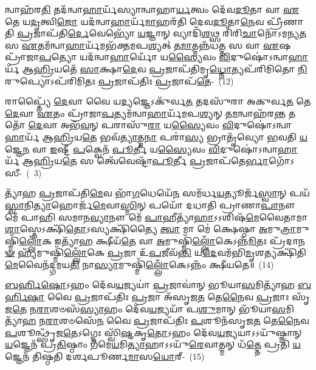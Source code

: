 𑌨𑍍𑌵𑌾𑌹᳴𑌰\-\ul{𑌤𑌿} 𑌤𑌦᳴𑌨𑍍𑌵𑌾\-\ul{𑌹𑌾}\-𑌰𑍍𑌯᳴𑌸𑍍𑌯𑌾𑌨𑍍𑌵𑌾𑌹𑌾\-\ul{𑌰𑍍𑌯}\-𑌤𑍍𑌵𑌂 𑌦𑍇᳴𑌵\-\ul{𑌦𑍂}\-𑌤𑌾 𑌵𑌾 \ul{𑌏}\-𑌤𑍇 𑌯\-\ul{𑌦𑍃}\-𑌤𑍍𑌵𑌿\-\ul{𑌜𑍋} 𑌯𑌦᳴𑌨𑍍𑌵𑌾\-\ul{𑌹𑌾}\-𑌰𑍍𑌯᳴\-\ul{𑌮𑌾}\-𑌹𑌰᳴𑌤𑌿 𑌦𑍇𑌵\-\ul{𑌦𑍂}\-𑌤𑌾\-\ul{𑌨𑍇}\-𑌵 𑌪𑍍𑌰𑍀᳴𑌣𑌾𑌤𑌿 \ul{𑌪𑍍𑌰}\-𑌜𑌾𑌪᳴𑌤𑌿\-\ul{𑌰𑍍𑌦𑍇}\-𑌵𑍇𑌭𑍍𑌯𑍋᳴ \ul{𑌯}\-𑌜𑍍𑌞𑌾𑌨𑍍 𑌵𑍍𑌯𑌾𑌦𑌿᳴\-\ul{𑌶}\-𑌥𑍍𑌸 𑌰𑌿᳴𑌰𑌿\-\ul{𑌚𑌾}\-𑌨𑍋᳴\-𑌽𑌮𑌨𑍍𑌯\-\ul{𑌤} 𑌸 \ul{𑌏}\-𑌤𑌮᳴𑌨𑍍𑌵𑌾\-\ul{𑌹𑌾}\-𑌰𑍍𑌯᳴𑌮𑌭᳴𑌕𑍍𑌤𑌮𑌪\-\ul{𑌶𑍍𑌯}\-𑌤𑍍 𑌤\-\ul{𑌮𑌾}\-𑌤𑍍𑌮𑌨𑍍𑌨᳴𑌧\-\ul{𑌤𑍍𑌤} 𑌸 𑌵𑌾 \ul{𑌏}\-𑌷 𑌪𑍍𑌰𑌾᳴𑌜𑌾\-\ul{𑌪}\-𑌤𑍍𑌯𑍋 𑌯𑌦᳴𑌨𑍍𑌵𑌾\-\ul{𑌹𑌾}\-𑌰𑍍𑌯𑍋᳴ 𑌯\-\ul{𑌸𑍍𑌯𑍈}\-𑌵𑌂 \ul{𑌵𑌿}\-𑌦𑍁𑌷𑍋॑\-𑌽𑌨𑍍𑌵𑌾\-\ul{𑌹𑌾}\-𑌰𑍍𑌯᳴ 𑌆\-\ul{𑌹𑍍𑌰𑌿}\-𑌯𑌤𑍇᳴ \ul{𑌸𑌾}\-𑌕𑍍𑌷𑌾\-\ul{𑌦𑍇}\-𑌵 \ul{𑌪𑍍𑌰}\-𑌜𑌾𑌪᳴𑌤𑌿𑌮𑍃\-\ul{𑌧𑍍𑌨𑍋}\-𑌤𑍍𑌯𑌪᳴𑌰𑌿𑌮𑌿𑌤𑍋 \ul{𑌨𑌿}\-𑌰𑍁𑌪𑍍𑌯𑍋\-𑌽𑌪᳴𑌰𑌿𑌮𑌿𑌤𑌃 \ul{𑌪𑍍𑌰}\-𑌜𑌾𑌪᳴𑌤𑌿𑌃 \ul{𑌪𑍍𑌰}\-𑌜𑌾𑌪᳴\-\ul{𑌤𑍇}\--~(12)

𑌰𑌾𑌪𑍍𑌤𑍍𑌯𑍈᳴ \ul{𑌦𑍇}\-𑌵𑌾 𑌵𑍈 𑌯\-\ul{𑌦𑍍𑌯}\-𑌜𑍍𑌞𑍇\-𑌽𑌕𑍁᳴𑌰𑍍𑌵\-\ul{𑌤} 𑌤𑌦𑌸𑍁᳴𑌰𑌾 𑌅𑌕𑍁𑌰𑍍𑌵\-\ul{𑌤} 𑌤𑍇 \ul{𑌦𑍇}\-𑌵𑌾 \ul{𑌏}\-𑌤𑌂 𑌪𑍍𑌰𑌾᳴𑌜𑌾\-\ul{𑌪}\-𑌤𑍍𑌯𑌮᳴𑌨𑍍𑌵𑌾\-\ul{𑌹𑌾}\-𑌰𑍍𑌯᳴𑌮𑌪\-\ul{𑌶𑍍𑌯}\-𑌨𑍍 𑌤\-\ul{𑌮}\-𑌨𑍍𑌵𑌾𑌹᳴𑌰\-\ul{𑌨𑍍𑌤} 𑌤𑌤𑍋᳴ \ul{𑌦𑍇}\-𑌵𑌾 𑌅𑌭᳴\-\ul{𑌵}\-𑌨𑍍 𑌪𑌰𑌾𑌸𑍁᳴\-\ul{𑌰𑌾} 𑌯\-\ul{𑌸𑍍𑌯𑍈}\-𑌵𑌂 \ul{𑌵𑌿}\-𑌦𑍁𑌷𑍋॑\-𑌽𑌨𑍍𑌵𑌾\-\ul{𑌹𑌾}\-𑌰𑍍𑌯᳴ 𑌆\-\ul{𑌹𑍍𑌰𑌿}\-𑌯\-\ul{𑌤𑍇} 𑌭𑌵᳴\-\ul{𑌤𑍍𑌯𑌾}\-𑌤𑍍𑌮\-\ul{𑌨𑌾} 𑌪𑌰𑌾॑\-\ul{𑌸𑍍𑌯} 𑌭𑍍𑌰𑌾𑌤𑍃᳴𑌵𑍍𑌯𑍋 𑌭𑌵𑌤𑌿 \ul{𑌯}\-𑌜𑍍𑌞𑍇\-\ul{𑌨} 𑌵𑌾 \ul{𑌇}\-𑌷𑍍𑌟𑍀 \ul{𑌪}\-𑌕𑍍𑌵𑍇𑌨᳴ \ul{𑌪𑍂}\-𑌰𑍍𑌤𑍀 𑌯\-\ul{𑌸𑍍𑌯𑍈}\-𑌵𑌂 \ul{𑌵𑌿}\-𑌦𑍁𑌷𑍋॑\-𑌽𑌨𑍍𑌵𑌾\-\ul{𑌹𑌾}\-𑌰𑍍𑌯᳴ 𑌆\-\ul{𑌹𑍍𑌰𑌿}\-𑌯\-\ul{𑌤𑍇} 𑌸 𑌤𑍍𑌵𑍇᳴𑌵𑍇𑌷𑍍𑌟𑌾᳴\-\ul{𑌪𑍂}\-𑌰𑍍𑌤𑍀 \ul{𑌪𑍍𑌰}\-𑌜𑌾𑌪᳴𑌤𑍇\-\ul{𑌰𑍍𑌭𑌾}\-𑌗𑍋᳴\-\mbox{𑌽𑌸𑍀-~(~3)}

𑌤𑍍𑌯𑌾᳴𑌹 \ul{𑌪𑍍𑌰}\-𑌜𑌾𑌪᳴𑌤𑌿\-\ul{𑌮𑍇}\-𑌵 𑌭𑌾᳴\-\ul{𑌗}\-𑌧𑍇𑌯𑍇᳴\-\ul{𑌨} 𑌸𑌮᳴𑌰𑍍𑌧\-\ul{𑌯}\-𑌤𑍍𑌯𑍂𑌰𑍍𑌜᳴\-\ul{𑌸𑍍𑌵𑌾}\-𑌨𑍍 𑌪𑌯᳴\-\ul{𑌸𑍍𑌵𑌾}\-𑌨𑌿\-\ul{𑌤𑍍𑌯𑌾}\-𑌹𑍋𑌰𑍍𑌜᳴\-\ul{𑌮𑍇}\-𑌵𑌾\-\ul{𑌸𑍍𑌮𑌿}\-𑌨𑍍 𑌪𑌯𑍋᳴ 𑌦𑌧𑌾𑌤𑌿 𑌪𑍍𑌰𑌾𑌣𑌾\-\ul{𑌪𑌾}\-𑌨𑍗 𑌮𑍇᳴ 𑌪𑌾𑌹𑌿 𑌸𑌮𑌾𑌨\-\ul{𑌵𑍍𑌯𑌾}\-𑌨𑍗 𑌮𑍇᳴ \ul{𑌪𑌾}\-𑌹𑍀𑌤𑍍𑌯𑌾᳴\-\ul{𑌹𑌾}\-\-𑌽\-𑌽𑌶𑌿𑌷᳴\-\ul{𑌮𑍇}\-𑌵𑍈𑌤𑌾𑌮𑌾 \ul{𑌶𑌾}\-𑌸𑍍𑌤𑍇\-𑌽𑌕𑍍𑌷𑌿᳴\-\ul{𑌤𑍋}\-\-𑌽𑌸𑍍𑌯𑌕𑍍𑌷𑌿᳴𑌤𑍍𑌯𑍈 \ul{𑌤𑍍𑌵𑌾} 𑌮𑌾 𑌮𑍇॑ 𑌕𑍍𑌷𑍇𑌷𑍍𑌠𑌾 \ul{𑌅}\-𑌮𑍁\-\ul{𑌤𑍍𑌰𑌾}\-𑌮𑍁𑌷𑍍𑌮𑌿᳴\-\ul{𑌲𑍍𑌲𑍋𑌁}\-𑌕 𑌇𑌤𑍍𑌯𑌾᳴\-\ul{𑌹} 𑌕𑍍𑌷𑍀𑌯᳴\-\ul{𑌤𑍇} 𑌵𑌾 \ul{𑌅}\-𑌮𑍁𑌷𑍍𑌮𑌿᳴\-\ul{𑌲𑍍𑌲𑍋𑌁}\-𑌕𑍇\-𑌽𑌨𑍍𑌨᳴\-\ul{𑌮𑌿}\-𑌤𑌃 𑌪𑍍𑌰᳴𑌦𑌾\-\ul{𑌨}\-\-\ul{𑍟} 𑌹𑍍𑌯᳴𑌮𑍁𑌷𑍍𑌮𑌿᳴\-\ul{𑌲𑍍𑌲𑍋𑌁}\-𑌕𑍇 \ul{𑌪𑍍𑌰}\-𑌜𑌾 𑌉᳴\-\ul{𑌪}\-𑌜𑍀𑌵᳴\-\ul{𑌨𑍍𑌤𑌿} 𑌯\-\ul{𑌦𑍇}\-𑌵𑌮᳴𑌭𑌿\-\ul{𑌮𑍃}\-𑌶𑌤𑍍𑌯𑌕𑍍𑌷𑌿᳴𑌤𑌿\-\ul{𑌮𑍇}\-𑌵𑍈𑌨᳴𑌦𑍍𑌗𑌮𑌯\-\ul{𑌤𑌿} 𑌨𑌾\-\ul{𑌸𑍍𑌯𑌾}\-𑌮𑍁𑌷𑍍𑌮𑌿᳴\-\ul{𑌲𑍍𑌲𑍋𑌁}\-𑌕𑍇\-𑌽𑌨𑍍𑌨𑌂᳴ 𑌕𑍍𑌷𑍀𑌯𑌤𑍇॥~(14)

{\anuvakamend[{\-\ul{𑌅}\-\-\ul{𑌨𑍍𑌵𑌾}\-\-\ul{𑌹𑌾}\-𑌰𑍍𑌯𑍇᳴𑌣 \ul{𑌪𑍍𑌰}\-𑌜𑌾𑌪᳴𑌤𑍇𑌰\-\ul{𑌸𑌿} 𑌹𑍍𑌯᳴𑌮𑍁𑌷𑍍𑌮𑌿᳴\-\ul{𑌲𑍍𑌲𑍋𑌁}\-𑌕𑍇 𑌪𑌞𑍍𑌚᳴𑌦𑌶 𑌚}]}%

\-\ul{𑌬}\-\-\ul{𑌰𑍍}\-\mbox{}𑌹𑌿\-\ul{𑌷𑍋}\-\-𑌽𑌹𑌂 𑌦𑍇᳴𑌵\-\ul{𑌯}\-𑌜𑍍𑌯𑌯𑌾॑ \ul{𑌪𑍍𑌰}\-𑌜𑌾𑌵𑌾॑𑌨𑍍 𑌭𑍂𑌯𑌾\-\ul{𑌸}\-𑌮𑌿𑌤𑍍𑌯𑌾᳴𑌹 \ul{𑌬}\-\-\ul{𑌰𑍍}\-\mbox{}𑌹𑌿\-\ul{𑌷𑌾} 𑌵𑍈 \ul{𑌪𑍍𑌰}\-𑌜𑌾𑌪᳴𑌤𑌿𑌃 \ul{𑌪𑍍𑌰}\-𑌜𑌾 𑌅᳴𑌸𑍃𑌜\-\ul{𑌤} 𑌤𑍇\-\ul{𑌨𑍈}\-𑌵 \ul{𑌪𑍍𑌰}\-𑌜𑌾𑌃 𑌸𑍃᳴𑌜\-\ul{𑌤𑍇} 𑌨\-\ul{𑌰𑌾}\-𑌶𑍞𑌸᳴\-\ul{𑌸𑍍𑌯𑌾}\-𑌹𑌂 𑌦𑍇᳴𑌵\-\ul{𑌯}\-𑌜𑍍𑌯𑌯𑌾᳴ 𑌪\-\ul{𑌶𑍁}\-𑌮𑌾𑌨𑍍 𑌭𑍂᳴𑌯𑌾\-\ul{𑌸}\-𑌮𑌿𑌤𑍍𑌯𑌾᳴\-\ul{𑌹} 𑌨\-\ul{𑌰𑌾}\-𑌶𑍞𑌸𑍇᳴\-\ul{𑌨} 𑌵𑍈 \ul{𑌪𑍍𑌰}\-𑌜𑌾𑌪᳴𑌤𑌿𑌃 \ul{𑌪}\-𑌶𑍂𑌨᳴𑌸𑍃𑌜\-\ul{𑌤} 𑌤𑍇\-\ul{𑌨𑍈}\-𑌵 \ul{𑌪}\-𑌶𑍂𑌨𑍍𑌥𑍍𑌸𑍃᳴𑌜\-\ul{𑌤𑍇}\-\-𑌽𑌗𑍍𑌨𑍇𑌃 𑌸𑍍𑌵𑌿᳴\-\ul{𑌷𑍍𑌟}\-𑌕𑍃\-\ul{𑌤𑍋}\-\-𑌽𑌹𑌂 𑌦𑍇᳴𑌵\-\ul{𑌯}\-𑌜𑍍𑌯𑌯𑌾\-𑌽\-𑌽𑌯𑍁᳴𑌷𑍍𑌮𑌾𑌨𑍍 \ul{𑌯}\-𑌜𑍍𑌞𑍇𑌨᳴ 𑌪𑍍𑌰\-\ul{𑌤𑌿}\-𑌷𑍍𑌠𑌾𑌂 𑌗᳴𑌮𑍇\-\ul{𑌯}\-𑌮𑌿\-\ul{𑌤𑍍𑌯𑌾}\-𑌹𑌾\-𑌽\-𑌽𑌯𑍁᳴\-\ul{𑌰𑍇}\-𑌵𑌾𑌤𑍍𑌮𑌨𑍍 𑌧᳴\-\ul{𑌤𑍍𑌤𑍇} 𑌪𑍍𑌰𑌤𑌿᳴ \ul{𑌯}\-𑌜𑍍𑌞𑍇𑌨᳴ 𑌤𑌿𑌷𑍍𑌠𑌤𑌿 𑌦𑌰𑍍\mbox{}𑌶𑌪𑍂𑌰𑍍𑌣\-\ul{𑌮𑌾}\-𑌸\-\ul{𑌯𑍋}\-𑌰𑍍-~(15)

